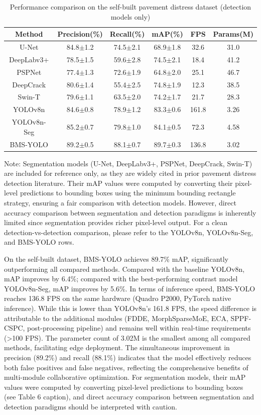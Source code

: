 \documentclass[twocolumn]{sn-jnl}
\begin{document}
	\begin{table}[htbp]
		\centering
		\caption{Performance comparison on the self-built pavement distress dataset (detection models only)}
		\begin{tabular}{cccccc}
			\toprule
			Method & Precision(\%) & Recall(\%) & mAP(\%) & FPS & Params(M) \\
			\midrule
			U-Net & 84.8$\pm$1.2 & 74.5$\pm$2.1 & 68.9$\pm$1.8 & 32.6 & 31.0 \\
			DeepLabv3+ & 78.5$\pm$1.5 & 59.6$\pm$2.8 & 74.5$\pm$2.1 & 18.4 & 41.2 \\
			PSPNet & 77.4$\pm$1.3 & 72.6$\pm$1.9 & 64.8$\pm$2.0 & 25.1 & 46.7 \\
			DeepCrack & 80.6$\pm$1.4 & 55.4$\pm$2.5 & 74.8$\pm$1.9 & 12.3 & 38.5 \\
			Swin-T & 79.6$\pm$1.1 & 63.5$\pm$2.0 & 74.2$\pm$1.7 & 21.7 & 28.3 \\
			YOLOv8n & 84.6$\pm$0.8 & 78.9$\pm$1.2 & 83.3$\pm$0.6 & 161.8 & 3.26 \\
			YOLOv8n-Seg & 85.2$\pm$0.7 & 79.8$\pm$1.0 & 84.1$\pm$0.5 & 72.3 & 4.58 \\
			BMS-YOLO & 89.2$\pm$0.5 & 88.1$\pm$0.7 & 89.7$\pm$0.3 & 136.8 & 3.02 \\
			\bottomrule
		\end{tabular}
		\label{tab:compare_self}
	\end{table}

	Note: Segmentation models (U-Net, DeepLabv3+, PSPNet, DeepCrack, Swin-T) are included for reference only, as they are widely cited in prior pavement distress detection literature. Their mAP values were computed by converting their pixel-level predictions to bounding boxes using the minimum bounding rectangle strategy, ensuring a fair comparison with detection models. However, direct accuracy comparison between segmentation and detection paradigms is inherently limited since segmentation provides richer pixel-level output. For a clean detection-vs-detection comparison, please refer to the YOLOv8n, YOLOv8n-Seg, and BMS-YOLO rows.
	
	On the self-built dataset, BMS-YOLO achieves 89.7\% mAP, significantly outperforming all compared methods. Compared with the baseline YOLOv8n, mAP improves by 6.4\%; compared with the best-performing contrast model YOLOv8n-Seg, mAP improves by 5.6\%. In terms of inference speed, BMS-YOLO reaches 136.8 FPS on the same hardware (Quadro P2000, PyTorch native inference). While this is lower than YOLOv8n's 161.8 FPS, the speed difference is attributable to the additional modules (FDDE, MorphSparseMoE, ECA, SPPF-CSPC, post-processing pipeline) and remains well within real-time requirements (>100 FPS). The parameter count of 3.02M is the smallest among all compared methods, facilitating edge deployment. The simultaneous improvement in precision (89.2\%) and recall (88.1\%) indicates that the model effectively reduces both false positives and false negatives, reflecting the comprehensive benefits of multi-module collaborative optimization. For segmentation models, their mAP values were computed by converting pixel-level predictions to bounding boxes (see Table 6 caption), and direct accuracy comparison between segmentation and detection paradigms should be interpreted with caution.
	
\end{document}
